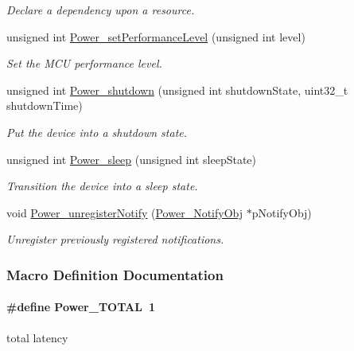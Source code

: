 \begin{DoxyCompactItemize}
\begin{DoxyCompactList}\small\item\em Declare a dependency upon a resource. \end{DoxyCompactList}\item 
unsigned int \hyperlink{_power_8h_ade9f8442c59deb341f6f5da729e90635}{Power\+\_\+set\+Performance\+Level} (unsigned int level)
\begin{DoxyCompactList}\small\item\em Set the M\+C\+U performance level. \end{DoxyCompactList}\item 
unsigned int \hyperlink{_power_8h_a29fb5d887d2b49ffbe86472dee8cd338}{Power\+\_\+shutdown} (unsigned int shutdown\+State, uint32\+\_\+t shutdown\+Time)
\begin{DoxyCompactList}\small\item\em Put the device into a shutdown state. \end{DoxyCompactList}\item 
unsigned int \hyperlink{_power_8h_ad26ff0368295bc388f8cbcaa289fb4b2}{Power\+\_\+sleep} (unsigned int sleep\+State)
\begin{DoxyCompactList}\small\item\em Transition the device into a sleep state. \end{DoxyCompactList}\item 
void \hyperlink{_power_8h_ac32c17ce6da099da97957f08ddb000b4}{Power\+\_\+unregister\+Notify} (\hyperlink{struct_power___notify_obj}{Power\+\_\+\+Notify\+Obj} $\ast$p\+Notify\+Obj)
\begin{DoxyCompactList}\small\item\em Unregister previously registered notifications. \end{DoxyCompactList}\end{DoxyCompactItemize}


\subsubsection{Macro Definition Documentation}
\paragraph[{Power\+\_\+\+T\+O\+T\+A\+L}]{\setlength{\rightskip}{0pt plus 5cm}\#define Power\+\_\+\+T\+O\+T\+A\+L~1}\label{_power_8h_aa5e33b10202cc5a261c1800b4ae1de3e}
total latency 
